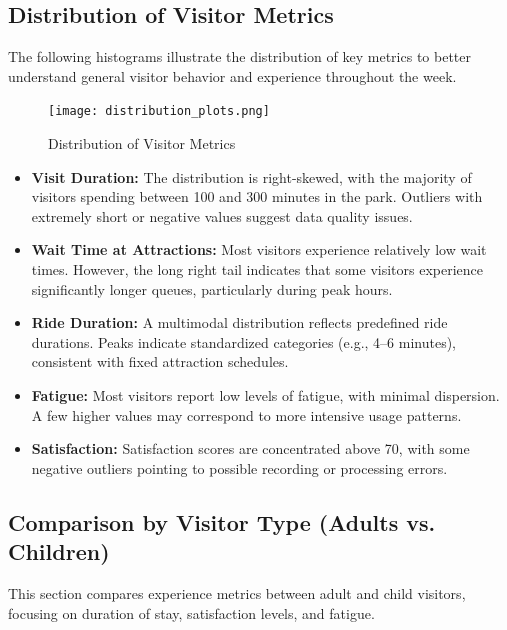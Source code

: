\documentclass[12pt]{article}
\begin{document}
\subsection{Distribution of Visitor Metrics}

The following histograms illustrate the distribution of key metrics to better understand general visitor behavior and experience throughout the week.

\begin{figure}[H]
    \centering
    \texttt{[image: distribution\_plots.png]}
    \caption{Distribution of Visitor Metrics}
    \label{fig:distribution-metrics}
\end{figure}

\begin{itemize}
    \item \textbf{Visit Duration:} The distribution is right-skewed, with the majority of visitors spending between 100 and 300 minutes in the park. Outliers with extremely short or negative values suggest data quality issues.
    \item \textbf{Wait Time at Attractions:} Most visitors experience relatively low wait times. However, the long right tail indicates that some visitors experience significantly longer queues, particularly during peak hours.
    \item \textbf{Ride Duration:} A multimodal distribution reflects predefined ride durations. Peaks indicate standardized categories (e.g., 4–6 minutes), consistent with fixed attraction schedules.
    \item \textbf{Fatigue:} Most visitors report low levels of fatigue, with minimal dispersion. A few higher values may correspond to more intensive usage patterns.
    \item \textbf{Satisfaction:} Satisfaction scores are concentrated above 70, with some negative outliers pointing to possible recording or processing errors.
\end{itemize}

\subsection{Comparison by Visitor Type (Adults vs. Children)}

This section compares experience metrics between adult and child visitors, focusing on duration of stay, satisfaction levels, and fatigue.
\end{document}
